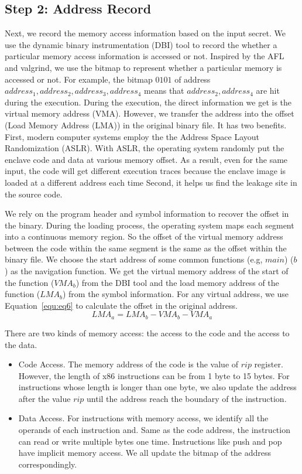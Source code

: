 \subsection{Step 2: Address Record}
Next, we record the memory access information based on the input secret. We use the dynamic binary instrumentation (DBI) tool to record the whether a particular memory access information is accessed or not. Inspired by the AFL and valgrind, we use the bitmap to represent whether a particular memory is accessed or not. For example, the bitmap ${0101}$ of address $address_1, address_2, address_3, address_4$ means that $address_2, address_4$ are hit during the execution. During the execution, the direct information we get is the virtual memory address (VMA). However, we transfer the address into the offset (Load Memory Address (LMA)) in the original binary file. It has two benefits. First, modern computer systems employ the the Address Space Layout Randomization (ASLR). With ASLR, the operating system randomly put the enclave code and data at various memory offset. As a result, even for the same input, the code will get different execution traces because the enclave image is loaded at a different address each time Second, it helps us find the leakage site in the source code.

We rely on the program header and symbol information to recover the offset in the binary. During the loading process, the operating system maps each segment into a continuous memory region. So the offset of the virtual memory address between the code within the same segment is the same as the offset within the binary file. We choose the start address of some common functions (e.g, $main$) ($b$) as the navigation function. We get the virtual memory address of the start of the function ($\mathit{VMA_b}$) from the DBI tool and the load memory address of the function ($\mathit{LMA_b}$) from the symbol information. For any virtual address, we use Equation~\ref{equ:eq6} to calculate the offset in the original address.
\begin{equation}\label{equ:eq6}
  \mathit{LMA_a} = \mathit{LMA_b} - VMA_b - VMA_a
\end{equation}

There are two kinds of memory access: the access to the code and the access to the data.
\begin{itemize}
  \item Code Access. The memory address of the code is the value of $rip$ register. However, the length of x86 instructions can be from 1 byte to 15 bytes. For instructions whose length is longer than one byte, we also update the address  after the value $rip$ until the address reach the boundary of the instruction.
  \item Data Access. For instructions with memory access, we identify all the operands of each instruction and. Same as the code address, the instruction can read or write multiple bytes one time.  Instructions like \textsf{push} and \textsf{pop} have implicit memory access. We all update the bitmap of the address correspondingly.
\end{itemize}

